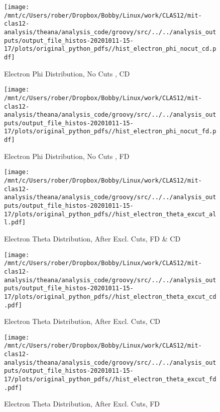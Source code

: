 \documentclass{article}
\begin{document}
\begin{landscape}
\begin{figure}[h]
        \texttt{[image: /mnt/c/Users/rober/Dropbox/Bobby/Linux/work/CLAS12/mit-clas12-analysis/theana/analysis\_code/groovy/src/../../analysis\_outputs/output\_file\_histos-20201011-15-17/plots/original\_python\_pdfs//hist\_electron\_phi\_nocut\_cd.pdf]}
        \captionsetup{textformat=empty,labelformat=blank}
        \caption{Electron Phi Distribution, No Cuts , CD}
    \end{figure}
    \clearpage
    
    \begin{figure}[h]
        \centering

        \texttt{[image: /mnt/c/Users/rober/Dropbox/Bobby/Linux/work/CLAS12/mit-clas12-analysis/theana/analysis\_code/groovy/src/../../analysis\_outputs/output\_file\_histos-20201011-15-17/plots/original\_python\_pdfs//hist\_electron\_phi\_nocut\_fd.pdf]}
        \captionsetup{textformat=empty,labelformat=blank}
        \caption{Electron Phi Distribution, No Cuts , FD}
    \end{figure}
    \clearpage
    
    \begin{figure}[h]
        \centering

        \texttt{[image: /mnt/c/Users/rober/Dropbox/Bobby/Linux/work/CLAS12/mit-clas12-analysis/theana/analysis\_code/groovy/src/../../analysis\_outputs/output\_file\_histos-20201011-15-17/plots/original\_python\_pdfs//hist\_electron\_theta\_excut\_all.pdf]}
        \captionsetup{textformat=empty,labelformat=blank}
        \caption{Electron Theta Distribution, After Excl. Cuts, FD \& CD}
    \end{figure}
    \clearpage
    
    \begin{figure}[h]
        \centering

        \texttt{[image: /mnt/c/Users/rober/Dropbox/Bobby/Linux/work/CLAS12/mit-clas12-analysis/theana/analysis\_code/groovy/src/../../analysis\_outputs/output\_file\_histos-20201011-15-17/plots/original\_python\_pdfs//hist\_electron\_theta\_excut\_cd.pdf]}
        \captionsetup{textformat=empty,labelformat=blank}
        \caption{Electron Theta Distribution, After Excl. Cuts, CD}
    \end{figure}
    \clearpage
    
    \begin{figure}[h]
        \centering

        \texttt{[image: /mnt/c/Users/rober/Dropbox/Bobby/Linux/work/CLAS12/mit-clas12-analysis/theana/analysis\_code/groovy/src/../../analysis\_outputs/output\_file\_histos-20201011-15-17/plots/original\_python\_pdfs//hist\_electron\_theta\_excut\_fd.pdf]}
        \captionsetup{textformat=empty,labelformat=blank}
        \caption{Electron Theta Distribution, After Excl. Cuts, FD}
    \end{figure}
    \clearpage
    

\end{landscape}
\end{document}
